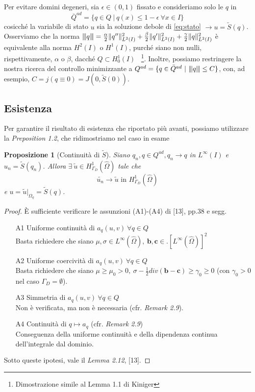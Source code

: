\documentclass[a4paper,11pt]{article}
\newcommand{\vertiii}[1]{{\left\vert\kern-0.25ex\left\vert\kern-0.25ex\left\vert #1 
    \right\vert\kern-0.25ex\right\vert\kern-0.25ex\right\vert}}
\newcommand{\Q}{Q^{ad}}
\newtheorem{prop}{Proposizione}
\theoremstyle{remark}
\begin{document}
Per evitare domini degeneri, sia $\epsilon\in (0,1)$ fissato e consideriamo solo le $q$ in
\begin{equation*}
\bar{Q}^{ad} = \{q\in Q\ |\ q(x)\leq 1-\epsilon\ \forall x\in I\}
\end{equation*}
cosicch\'e la variabile di stato $u$ sia la soluzione debole di \eqref{eq:stato} $\rightarrow u=\tilde{S}(q)$.\\
Osserviamo che la norma $\vertiii{q}= \frac{\alpha}{2}\|q''\|^2_{L^2(I)}+\frac{\beta}{2}\|q'\|^2_{L^2(I)}+\frac{\gamma}{2}\|q\|^2_{L^2(I)}$ \`e equivalente alla norma $H^2(I)$ o $H^1(I)$, purch\'e siano non nulli, rispettivamente, $\alpha$ o $\beta$, dacch\'e $Q\subset H^1_0(I)$ \  \footnote{Dimostrazione simile al Lemma 1.1 di Kiniger}. Inoltre, possiamo restringere la nostra ricerca del controllo minimizzante a $Q^{ad} = \{q\in \bar{Q}^{ad}\ |\ \vertiii{q} \leq C\}$, con, ad esempio, $C = j(q\equiv0)=J(0,\tilde{S}(0))$.

\subsection{Esistenza}
Per garantire il risultato di esistenza che riportato pi\`u avanti, possiamo utilizzare la \emph{Preposition 1.2}, che ridimostriamo nel caso in esame
\begin{prop}[Continuit\`a di $\tilde{S}$]
 Siano $q_n,q\in\Q,q_n\to q$ in $L^\infty(I)$ e $u_n=\tilde{S}(q_n)$. Allora $\exists\ \tilde{u}\in H^1_{\Gamma_D}(\hat{\Omega})$ tale che $$\tilde{u_n}\to\tilde{u}\text{ in }H^1_{\Gamma_D}(\hat{\Omega})$$
e $u=\tilde{u}|_{\Omega_q}=\tilde{S}(q)$.
\label{p:Scont}
\end{prop}
\begin{proof}
	\`E sufficiente verificare le assunzioni (A1)-(A4) di [13], pp.38 e segg.
	\begin{itemize}
		\item[A1] Uniforme continuit\`a di $a_q(u,v)\ \forall q\in Q$\\
			Basta richiedere che siano $\mu,\sigma\in L^\infty(\hat\Omega),\ \mathbf{b},\mathbf{c}\in. \left[L^\infty(\hat\Omega)\right]^2$
		\item[A2] Uniforme coercivit\`a di $a_q(u,v)\ \forall q\in Q$\\
			Basta richiedere che siano $\mu\geq\mu_0>0,\ \sigma-\frac{1}{2}div(\mathbf{b}-\mathbf{c})\geq\gamma_0\geq0$ (con $\gamma_0>0$ nel caso $\Gamma_D=\emptyset$).
		\item[A3] Simmetria di $a_q(u,v)\ \forall q\in Q$\\Non \`e verificata, ma non \`e necessaria (cfr. \emph{Remark 2.9}).
		\item[A4] Continuit\`a di $q\mapsto a_q$ (cfr. \emph{Remark 2.9})\\
			Conseguenza della uniforme continuit\`a e della dipendenza continua dell'integrale dal dominio.
	\end{itemize}
	Sotto queste ipotesi, vale il \emph{Lemma 2.12}, [13].
\end{proof}
\end{document}
